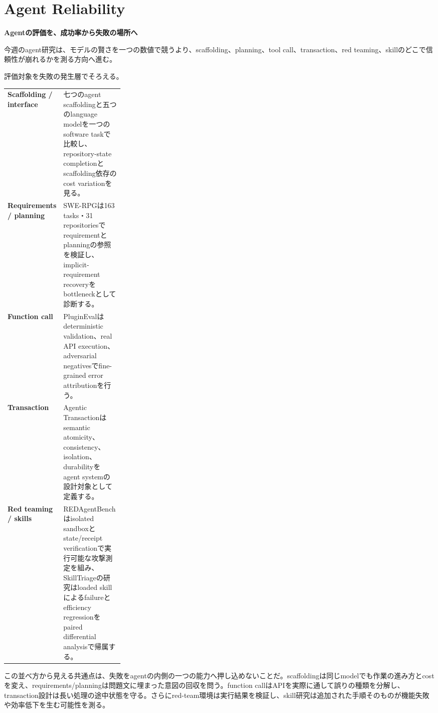 \section{Agent Reliability}
\begin{wideflow}
{\Large\bfseries Agentの評価を、成功率から失敗の場所へ}\par
\smallskip
{\color{SurveyMuted}今週のagent研究は、モデルの賢さを一つの数値で競うより、scaffolding、planning、tool call、transaction、red teaming、skillのどこで信頼性が崩れるかを測る方向へ進む。}\par
\end{wideflow}

評価対象を失敗の発生層でそろえる。

\begin{themeoverview}[信頼性を層別に測る]
\begin{tabularx}{\linewidth}{@{}>{\bfseries}p{0.27\linewidth}X@{}}
Scaffolding / interface & 七つのagent scaffoldingと五つのlanguage modelを一つのsoftware taskで比較し、repository-state completionとscaffolding依存のcost variationを見る\cite{scaffolding}。\\
Requirements / planning & SWE-RPGは163 tasks・31 repositoriesでrequirementとplanningの参照を検証し、implicit-requirement recoveryをbottleneckとして診断する\cite{swe-rpg}。\\
Function call & PluginEvalはdeterministic validation、real API execution、adversarial negativesでfine-grained error attributionを行う\cite{plugineval}。\\
Transaction & Agentic Transactionはsemantic atomicity、consistency、isolation、durabilityをagent systemの設計対象として定義する\cite{agentic-transaction}。\\
Red teaming / skills & REDAgentBenchはisolated sandboxとstate/receipt verificationで実行可能な攻撃測定を組み、SkillTriageの研究はloaded skillによるfailureとefficiency regressionをpaired differential analysisで帰属する\cite{redagentbench,skilltriage}。
\end{tabularx}
\end{themeoverview}

この並べ方から見える共通点は、失敗をagentの内側の一つの能力へ押し込めないことだ。scaffoldingは同じmodelでも作業の進み方とcostを変え、requirements/planningは問題文に埋まった意図の回収を問う。function callはAPIを実際に通して誤りの種類を分解し、transaction設計は長い処理の途中状態を守る。さらにred-team環境は実行結果を検証し、skill研究は追加された手順そのものが機能失敗や効率低下を生む可能性を測る。

